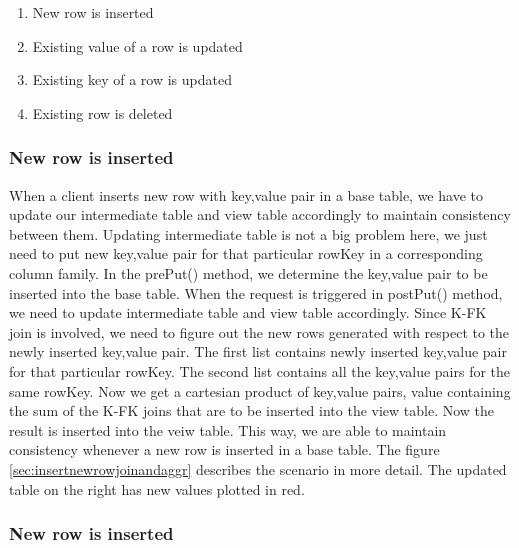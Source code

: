 \documentclass[11pt,a4paper,bibtotoc,idxtotoc,headsepline,footsepline,footexclude,BCOR12mm,DIV13]{scrbook}
\begin{document}




\begin{enumerate}
	\item New row is inserted
	\item Existing value of a row is updated
	\item Existing key of a row is updated
	\item Existing row is deleted
\end{enumerate}

\subsubsection{New row is inserted}

When a client inserts new row with key,value pair in a base table, we have to update our intermediate table and view table accordingly to maintain consistency between them. Updating intermediate table is not a big problem here, we just need to put new key,value pair for that particular rowKey in a corresponding column family. In the prePut() method, we determine the key,value pair to be inserted into the base table. When the request is triggered in postPut() method, we need to update intermediate table and view table accordingly. Since K-FK join is involved, we need to figure out the new rows generated with respect to the newly inserted key,value pair. The first list contains newly inserted key,value pair for that particular rowKey. The second list contains all the key,value pairs for the same rowKey. Now we get a cartesian product of key,value pairs, value containing the sum of the K-FK joins that are to be inserted into the view table. Now the result is inserted into the veiw table. This way, we are able to maintain consistency whenever a new row is inserted in a base table.
The figure \ref{sec:insertnewrowjoinandaggr} describes the scenario in more detail. The updated table on the right has new values plotted in red.

\subsubsection{New row is inserted}
\end{document}
